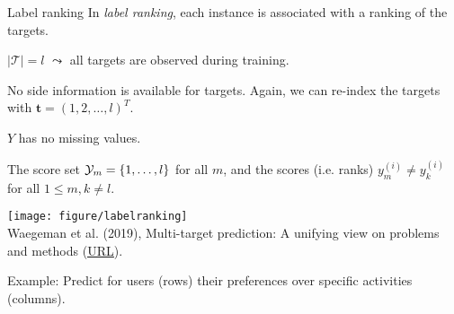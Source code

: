 \documentclass[11pt,compress,t,notes=noshow, xcolor=table]{beamer}
\newcommand{\Tspace}{\mathcal{T}}
\newcommand{\tv}{\mathbf{t}}
\newcommand{\yim}{y^{(i)}_m}
\begin{document}
\begin{frame}{Label ranking}
	\small
    In \emph{label ranking}, each instance is associated with a ranking of the targets. 

		\begin{enumerate}\small
			
			\begin{minipage}{0.45\textwidth}    
                \item $|\Tspace| = l$ $\leadsto$ all targets are observed during training. 
                \vspace{10pt}

    			\item No side information is available for targets. Again, we can re-index the targets with $\tv = (1, 2, \ldots, l)^T$. 		
                \vspace{10pt}
                
    			\item $Y$ has no missing values. 
                \vspace{10pt}
                
    			\item The score set $\mathcal{Y}_m = \{1, \ldots , l\}$ for all $m$, and the scores (i.e. ranks) $\yim \neq y_{k}^{(i)}$ for all $1 \leq m,k \neq l$. 
                \vspace{10pt}
			\end{minipage}
            \hfill
			\begin{minipage}{0.45\textwidth}    
			\begin{center}
                \texttt{[image: figure/labelranking]} \tiny
				\\ Waegeman et al. (2019), Multi-target prediction:
				A unifying view on problems and methods (\href{https://arxiv.org/pdf/1809.02352.pdf}{\underline{URL}}).
 	
			\end{center}
		\end{minipage}
		\end{enumerate}
  
    \vspace{10pt}
	Example: Predict for users (rows) their preferences over specific activities (columns).
	
\end{frame}
\end{document}
